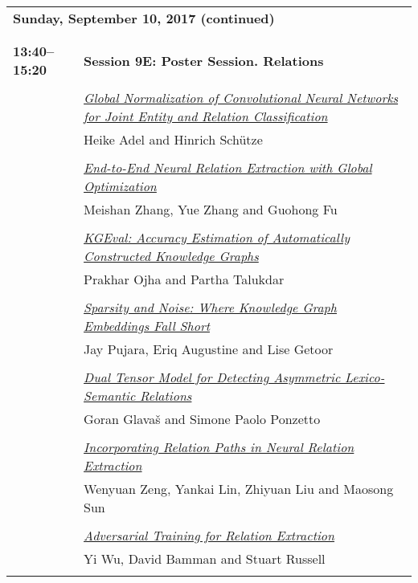 \begin{tabular}{p{20mm}p{128mm}}
\\
\multicolumn{2}{l}{\bf Sunday, September 10, 2017 (continued)} \\\\
\\{\bf 13:40--15:20} & {\bf Session 9E: Poster Session. Relations } \\
\\
 & \hyperlink{page.1722}{\em Global Normalization of Convolutional Neural Networks for Joint Entity and Relation Classification}\\
         & Heike Adel and Hinrich Sch\"{u}tze \\
\\

 & \hyperlink{page.1729}{\em End-to-End Neural Relation Extraction with Global Optimization}\\
         & Meishan Zhang, Yue Zhang and Guohong Fu \\
\\

 & \hyperlink{page.1740}{\em KGEval: Accuracy Estimation of Automatically Constructed Knowledge Graphs}\\
         & Prakhar Ojha and Partha Talukdar \\
\\

 & \hyperlink{page.1750}{\em Sparsity and Noise: Where Knowledge Graph Embeddings Fall Short}\\
         & Jay Pujara, Eriq Augustine and Lise Getoor \\
\\

 & \hyperlink{page.1756}{\em Dual Tensor Model for Detecting Asymmetric Lexico-Semantic Relations}\\
         & Goran Glava\v{s} and Simone Paolo Ponzetto \\
\\

 & \hyperlink{page.1767}{\em Incorporating Relation Paths in Neural Relation Extraction}\\
         & Wenyuan Zeng, Yankai Lin, Zhiyuan Liu and Maosong Sun \\
\\

 & \hyperlink{page.1777}{\em Adversarial Training for Relation Extraction}\\
         & Yi Wu, David Bamman and Stuart Russell \\
\\


\end{tabular}
